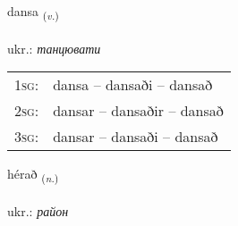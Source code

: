 \documentclass[frontgrid, backgrid]{flacards}\usepackage[]{graphicx}\usepackage[]{xcolor}
\begin{document}
\renewcommand{\flhead}{\vskip5pt \fboxsep=0pt {\small\bfseries\footnotesize Sagnorð | дієслово}}
\renewcommand{\fcfoot}{\vskip5pt \fboxsep=0pt \hspace{2pt}{\small\bfseries\footnotesize 2K}}

\renewcommand{\blhead}{\vskip5pt {\small\bfseries\footnotesize Sagnorð | дієслово }}
\renewcommand{\bcfoot}{\vskip5pt \hspace{2pt}{\small\bfseries\footnotesize 2K}}


{dansa \small{\textsubscript{(\textit{v.})}} \\[1ex] %
\textphonetic{[tansa]} \\
ukr.: \emph{танцювати} \\  [2ex]
\renewcommand*{\arraystretch}{0.8}
\begin{tabular}{p{1cm}l}
\textsc{1sg}: & dansa -- dansaði -- dansað \\ 
\textsc{2sg}: & dansar -- dansaðir -- dansað \\ 
\textsc{3sg}: & dansar -- dansaði -- dansað \\ 
\end{tabular}
}

\renewcommand{\flhead}{\vskip5pt \fboxsep=0pt {\small\bfseries\footnotesize Nafnorð | іменник}}
\renewcommand{\fcfoot}{\vskip5pt \fboxsep=0pt \hspace{2pt}{\small\bfseries\footnotesize 2K}}

\renewcommand{\blhead}{\vskip5pt {\small\bfseries\footnotesize Nafnorð | іменник }}
\renewcommand{\bcfoot}{\vskip5pt \hspace{2pt}{\small\bfseries\footnotesize 2K}}


{hérað \small{\textsubscript{(\textit{n.})}} \\[1ex] %
\textphonetic{[çɛːrað]} \\
ukr.: \emph{район} \\  [2ex]
\renewcommand*{\arraystretch}{0.8}
}
\end{document}
